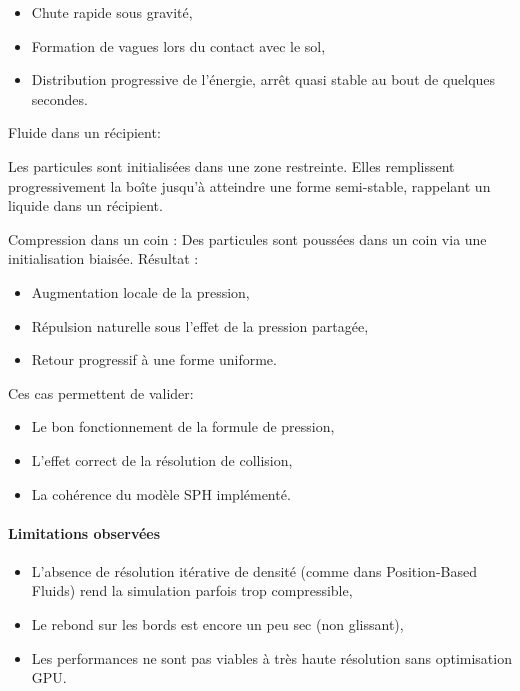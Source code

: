 \documentclass{article}
\begin{document}
\begin{itemize}
\item Chute rapide sous gravité,
\item Formation de vagues lors du contact avec le sol,
\item Distribution progressive de l'énergie, arrêt quasi stable au bout de quelques secondes.
\end{itemize}

Fluide dans un récipient:

Les particules sont initialisées dans une zone restreinte. Elles remplissent progressivement la boîte jusqu’à atteindre une forme semi-stable, rappelant un liquide dans un récipient.


Compression dans un coin : Des particules sont poussées dans un coin via une initialisation biaisée. Résultat :

\begin{itemize}
\item Augmentation locale de la pression,
\item Répulsion naturelle sous l’effet de la pression partagée,
\item Retour progressif à une forme uniforme.
\end{itemize}

Ces cas permettent de valider:

\begin{itemize}
\item Le bon fonctionnement de la formule de pression,
\item L’effet correct de la résolution de collision,
\item La cohérence du modèle SPH implémenté.
\end{itemize}

\paragraph{Limitations observées}

\begin{itemize}
\item L’absence de résolution itérative de densité (comme dans Position-Based Fluids) rend la simulation parfois trop compressible,
\item Le rebond sur les bords est encore un peu sec (non glissant),
\item Les performances ne sont pas viables à très haute résolution sans optimisation GPU.
\end{itemize}
\end{document}
